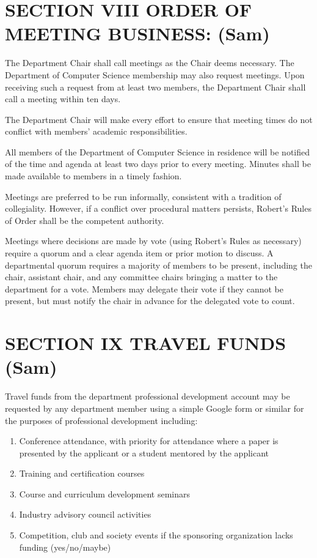 \documentclass{scrartcl}
\begin{document}
\section*{SECTION VIII ORDER OF MEETING BUSINESS: (Sam)}
{}


The Department Chair shall call meetings as the Chair deems necessary. The Department of Computer Science membership may also request meetings. Upon receiving such a request from at least two members, the Department Chair shall call a meeting within ten days.

The Department Chair will make every effort to ensure that meeting times do not conflict with members' academic responsibilities.

All members of the Department of Computer Science in residence will be notified of the time and agenda at least two days prior to every meeting. Minutes shall be made available to members in a timely fashion.

Meetings are preferred to be run informally, consistent with a tradition of collegiality. However, if a conflict over procedural matters persists, Robert's Rules of Order shall be the competent authority.

Meetings where decisions are made by vote (using Robert’s Rules as necessary) require a quorum and a clear agenda item or prior motion to discuss. A departmental quorum requires a majority of members to be present, including the chair, assistant chair, and any committee chairs bringing a matter to the department for a vote.  Members may delegate their vote if they cannot be present, but must notify the chair in advance for the delegated vote to count.

\section*{SECTION IX TRAVEL FUNDS (Sam)}
{}


Travel funds from the department professional development account may be requested by any department member using a simple Google form or similar for the purposes of professional development including:

\begin{enumerate}
\item Conference attendance, with priority for attendance where a paper is presented by the applicant or a student mentored by the applicant
\item Training and certification courses
\item Course and curriculum development seminars
\item Industry advisory council activities
\item Competition, club and society events if the sponsoring organization lacks funding (yes/no/maybe)
\end{enumerate}
\end{document}
